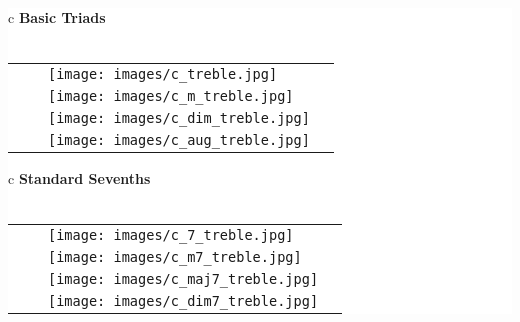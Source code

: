 \documentclass{standalone}
\begin{document}
\colorbox{white}{

\begin{tabular}{c}
    {\Large \textbf{Basic Triads}} \\  %
    \vspace{0.1cm} \\

    \begin{tabular}{>{\centering\arraybackslash}m{2cm} >{\centering\arraybackslash}m{1.5cm} m{3cm} m{3cm}}
        \raisebox{0.5\height}{C Major} & \raisebox{0.5\height}{C} & \texttt{[image: images/c\_treble.jpg]} & \raisebox{-0.25in}{\texttt{[image: images/c\_bass.jpg]}} \\
        \raisebox{0.5\height}{C Minor} & \raisebox{0.5\height}{$\mathrm{C}^-$} & \texttt{[image: images/c\_m\_treble.jpg]} & \raisebox{-0.2in}{\texttt{[image: images/c\_m\_bass.jpg]}} \\
        \raisebox{0.5\height}{C Diminished} & \raisebox{0.5\height}{$\mathrm{C}^\circ$} & \texttt{[image: images/c\_dim\_treble.jpg]} & \raisebox{-0.1in}{\texttt{[image: images/c\_dim\_bass.jpg]}} \\
        \raisebox{0.5\height}{C Augmented} & \raisebox{0.5\height}{$\mathrm{C}^+$} & \texttt{[image: images/c\_aug\_treble.jpg]} & \raisebox{-0.1in}{\texttt{[image: images/c\_aug\_bass.jpg]}} \\
    \end{tabular}
\end{tabular}

\vspace{1cm}

\begin{tabular}{c}
    {\Large \textbf{Standard Sevenths}} \\  %
    \vspace{0.1cm} \\

    \begin{tabular}{>{\centering\arraybackslash}m{2cm} >{\centering\arraybackslash}m{1.5cm} m{3cm} m{3cm}}
        \raisebox{0.5\height}{C7} & \raisebox{0.5\height}{$\mathrm{C}^7$} & \texttt{[image: images/c\_7\_treble.jpg]} & \raisebox{0.08in}{\texttt{[image: images/c\_7\_bass.jpg]}} \\
        \raisebox{0.5\height}{C Minor 7} & \raisebox{0.5\height}{$\mathrm{C}^-7$} & \texttt{[image: images/c\_m7\_treble.jpg]} & \raisebox{0.05in}{\texttt{[image: images/c\_m7\_bass.jpg]}} \\
        \raisebox{0.5\height}{C Major 7} & \raisebox{0.5\height}{$\mathrm{C}^\triangle$} & \texttt{[image: images/c\_maj7\_treble.jpg]} & \raisebox{-0.12in}{\texttt{[image: images/c\_maj7\_bass.jpg]}} \\
        \raisebox{0.5\height}{C Diminished 7} & \raisebox{0.5\height}{$\mathrm{C}^\circ7$} & \texttt{[image: images/c\_dim7\_treble.jpg]} & \raisebox{-0.1in}{\texttt{[image: images/c\_dim7\_bass.jpg]}} \\
    \end{tabular}
\end{tabular}

}
\end{document}
